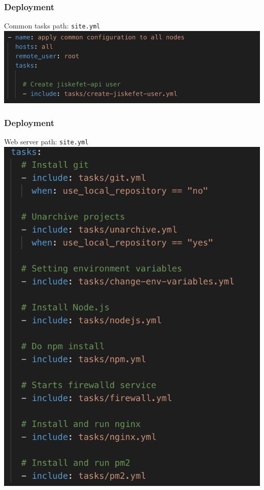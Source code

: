 \documentclass[12pt]{beamer}
\begin{document}
    \begin{frame}
        \frametitle{Deployment}
        Common tasks
        \newline
        path: \texttt{site.yml}
        \newline
   		\includegraphics[scale=.40]{assets/deploy_create_user.png}
    \end{frame}
    
    \begin{frame}
        \frametitle{Deployment}
        Web server
        \newline
        path: \texttt{site.yml}
        \newline
   		\includegraphics[scale=.30]{assets/deploy_webserver.png}
    \end{frame}
        
\end{document}
